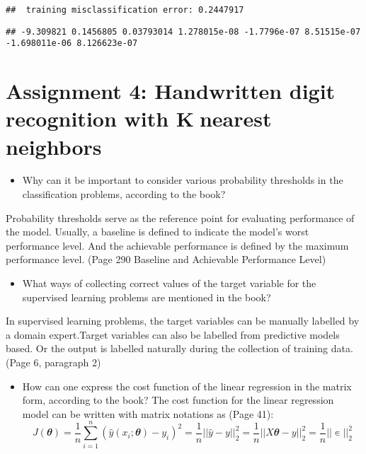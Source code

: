 \documentclass[
]{article}
\newenvironment{Shaded}{\begin{snugshade}}{\end{snugshade}}
\newcommand{\FloatTok}[1]{\textcolor[rgb]{0.00,0.00,0.81}{#1}}
\newcommand{\FunctionTok}[1]{\textcolor[rgb]{0.13,0.29,0.53}{\textbf{#1}}}
\newcommand{\NormalTok}[1]{#1}
\newcommand{\OtherTok}[1]{\textcolor[rgb]{0.56,0.35,0.01}{#1}}
\newcommand{\SpecialCharTok}[1]{\textcolor[rgb]{0.81,0.36,0.00}{\textbf{#1}}}
\newcommand{\StringTok}[1]{\textcolor[rgb]{0.31,0.60,0.02}{#1}}
\providecommand{\tightlist}{%
  \setlength{\itemsep}{0pt}\setlength{\parskip}{0pt}}
\begin{document}
\begin{verbatim}
##  training misclassification error: 0.2447917
\end{verbatim}

\begin{Shaded}
\end{Shaded}

\begin{verbatim}
## -9.309821 0.1456805 0.03793014 1.278015e-08 -1.7796e-07 8.51515e-07 -1.698011e-06 8.126623e-07
\end{verbatim}

\section{Assignment 4: Handwritten digit recognition with Knearest
neighbors}\label{assignment-4-handwritten-digit-recognition-with-knearest-neighbors}

\begin{itemize}
\tightlist
\item
  Why can it be important to consider various probability thresholds in
  the classification problems, according to the book?
\end{itemize}

Probability thresholds serve as the reference point for evaluating
performance of the model. Usually, a baseline is defined to indicate the
model's worst performance level. And the achievable performance is
defined by the maximum performance level. (Page 290 Baseline and
Achievable Performance Level)

\begin{itemize}
\tightlist
\item
  What ways of collecting correct values of the target variable for the
  supervised learning problems are mentioned in the book?
\end{itemize}

In supervised learning problems, the target variables can be manually
labelled by a domain expert.Target variables can also be labelled from
predictive models based. Or the output is labelled naturally during the
collection of training data. (Page 6, paragraph 2)

\begin{itemize}
\tightlist
\item
  How can one express the cost function of the linear regression in the
  matrix form, according to the book? The cost function for the linear
  regression model can be written with matrix notations as (Page 41): \[
     J(𝜽)= \frac{1}{n}\sum_{i = 1}^{n}{(\hat{y}{(x_i;𝜽)} - y_i)^2}=\frac{1}{n}
     ||\hat{y}-y||^{2}_{2}=\frac{1}{n}||{X𝜽}-y||^{2}_{2}=\frac{1}{n}||∊||^{2}_{2}
  \]
\end{itemize}
\end{document}
